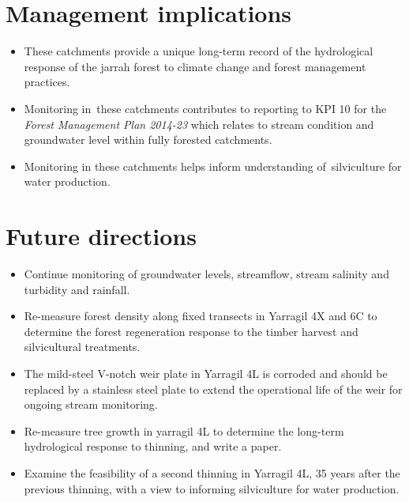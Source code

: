 \documentclass[version=last, paper=a4, DIV=18, usenames, dvipsnames]{scrartcl}
\begin{document}
\section*{Management implications}
\begin{itemize}
\itemsep1pt\parskip0pt
\item
  These catchments provide a unique long-term record of the hydrological
  response of the jarrah forest to climate change and forest management
  practices.
\item
  Monitoring in~these catchments contributes to reporting to KPI 10 for
  the \emph{Forest Management Plan 2014-23} which relates to stream
  condition and groundwater level within fully forested catchments.
\item
  Monitoring in these catchments helps inform understanding
  of~silviculture for water production.
\end{itemize}



\section*{Future directions}
\begin{itemize}
\itemsep1pt\parskip0pt
\item
  Continue monitoring of groundwater levels, streamflow, stream salinity
  and turbidity and rainfall.
\item
  Re-measure forest density along fixed transects in Yarragil 4X and 6C
  to determine the forest regeneration response to the timber harvest
  and silvicultural treatments.
\item
  The mild-steel V-notch weir plate in Yarragil 4L is corroded and
  should be replaced by a stainless steel plate to extend the
  operational life of the weir for ongoing stream monitoring.
\item
  Re-measure tree growth in yarragil 4L to determine the long-term
  hydrological response to thinning, and write a paper.
\item
  Examine the feasibility of a second thinning in Yarragil 4L, 35 years
  after the previous thinning, with a view to informing silviculture for
  water production.
\end{itemize}




\clearpage
\end{document}

